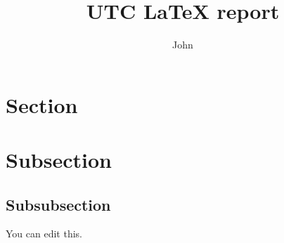 \documentclass{utc-report/utc-report}
\title{UTC LaTeX report}
\author{John \sc{DOE}}
\begin{document}
\maketitlepage

\tableofcontents{}

\pagebreak

\section{Section}
\section{Subsection}
\subsection{Subsubsection}

You can edit this.

\end{document}
